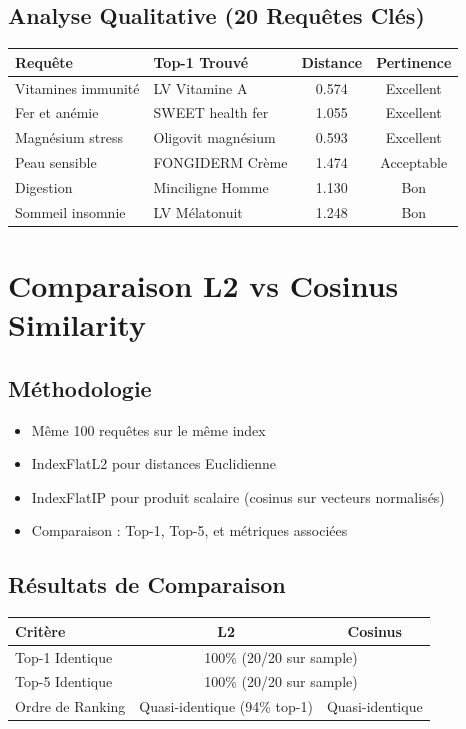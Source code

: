 \documentclass[12pt,a4paper]{article}
\begin{document}
\subsection{Analyse Qualitative (20 Requêtes Clés)}

\begin{center}
\begin{tabular}{|l|l|c|c|}
\hline
\textbf{Requête} & \textbf{Top-1 Trouvé} & \textbf{Distance} & \textbf{Pertinence} \\
\hline
Vitamines immunité & LV Vitamine A & 0.574 & Excellent \\
Fer et anémie & SWEET health fer & 1.055 & Excellent \\
Magnésium stress & Oligovit magnésium & 0.593 & Excellent \\
Peau sensible & FONGIDERM Crème & 1.474 & Acceptable \\
Digestion & Minciligne Homme & 1.130 & Bon \\
Sommeil insomnie & LV Mélatonuit & 1.248 & Bon \\
\hline
\end{tabular}
\end{center}

\section{Comparaison L2 vs Cosinus Similarity}

\subsection{Méthodologie}
\begin{itemize}
    \item Même 100 requêtes sur le même index
    \item IndexFlatL2 pour distances Euclidienne
    \item IndexFlatIP pour produit scalaire (cosinus sur vecteurs normalisés)
    \item Comparaison : Top-1, Top-5, et métriques associées
\end{itemize}

\subsection{Résultats de Comparaison}

\begin{center}
\begin{tabular}{|l|c|c|}
\hline
\textbf{Critère} & \textbf{L2} & \textbf{Cosinus} \\
\hline
Top-1 Identique & \multicolumn{2}{c|}{100\% (20/20 sur sample)} \\
Top-5 Identique & \multicolumn{2}{c|}{100\% (20/20 sur sample)} \\
Ordre de Ranking & Quasi-identique (94\% top-1) & Quasi-identique \\
\hline
\end{tabular}
\end{center}
\end{document}

